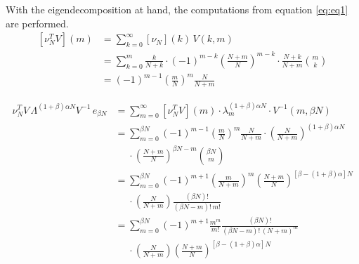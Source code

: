 \documentclass{article}
\newcommand{\ppar}[1]{\left( #1 \right)}
\newcommand{\spar}[1]{\left[ #1 \right]}
\begin{document}
With the eigendecomposition at hand, the computations from equation \eqref{eq:eq1} are performed.
\begin{align*}
    \spar{\nu_N^T V}(m) &=
    \sum_{k=0}^\infty \spar{\nu_N}(k)\, V(k,m) \\
    &=
    \sum_{k=0}^m
    \frac{k}{N+k} \cdot
    (-1)^{m-k} \ppar{\frac{N+m}{N}}^{m-k} \cdot \frac{N+k}{N+m} \binom{m}{k}
    \\
    &=
    (-1)^{m-1} \ppar{\frac{m}{N}}^m \frac{N}{N+m}
\end{align*}


\begin{align*}
    \nu_N^T V\, \Lambda^{(1+\beta) \alpha N} V^{-1}\, e_{\beta N}
    &=
    \sum_{m=0}^\infty 
    \spar{\nu_N^T V}(m)
    \cdot
    \lambda_m^{(1+\beta) \alpha N}
    \cdot
    V^{-1}(m, \beta N)
    \\
    &=
    \sum_{m=0}^{\beta N}
    (-1)^{m-1} \ppar{\frac{m}{N}}^m \frac{N}{N+m} \cdot
    \ppar{\frac{N}{N+m}}^{(1+\beta) \alpha N}
    \\
    &\phantom{=}
    \cdot \ppar{\frac{N+m}{N}}^{\beta N-m} \binom{\beta N}{m}
    \\
    &=
    \sum_{m=0}^{\beta N}
    (-1)^{m+1} 
    \ppar{\frac{m}{N+m}}^m \ppar{\frac{N+m}{N}}^{\spar{\beta-(1+\beta)\alpha} N}
    \\
    &\phantom{=}
    \cdot 
    \ppar{\frac{N}{N+m}} \frac{(\beta N)!}{(\beta N-m)!\, m!}
    \\
    &=
    \sum_{m=0}^{\beta N}
    (-1)^{m+1} 
    \frac{m^m}{m!} \frac{(\beta N)!}{(\beta N-m)!\, (N+m)^m}
    \\
    &\phantom{=}
    \cdot 
    \ppar{\frac{N}{N+m}} \ppar{\frac{N+m}{N}}^{\spar{\beta-(1+\beta)\alpha} N}
\end{align*}


\end{document}
